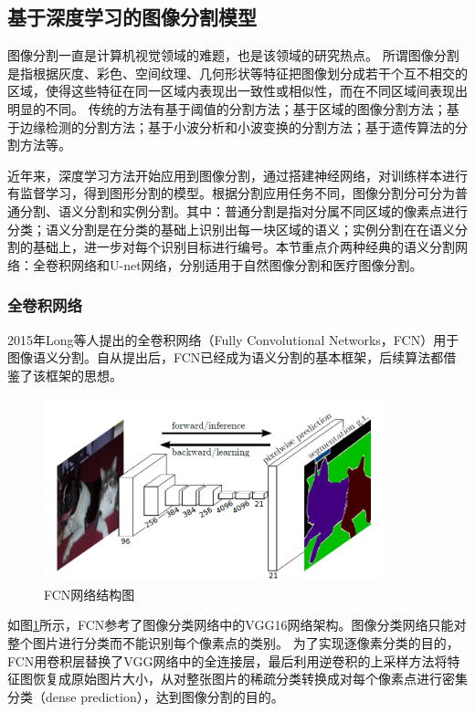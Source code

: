 \subsection{基于深度学习的图像分割模型}
图像分割一直是计算机视觉领域的难题，也是该领域的研究热点。
所谓图像分割是指根据灰度、彩色、空间纹理、几何形状等特征把图像划分成若干个互不相交的区域，使得这些特征在同一区域内表现出一致性或相似性，而在不同区域间表现出明显的不同。
传统的方法有基于阈值的分割方法；基于区域的图像分割方法；基于边缘检测的分割方法；基于小波分析和小波变换的分割方法；基于遗传算法的分割方法等\cite{图像分割方法综述}。

近年来，深度学习方法开始应用到图像分割，通过搭建神经网络，对训练样本进行有监督学习，得到图形分割的模型。根据分割应用任务不同，图像分割分可分为普通分割、语义分割和实例分割。其中：普通分割是指对分属不同区域的像素点进行分类；语义分割是在分类的基础上识别出每一块区域的语义；实例分割在在语义分割的基础上，进一步对每个识别目标进行编号。本节重点介两种经典的语义分割网络：全卷积网络和U-net网络，分别适用于自然图像分割和医疗图像分割。


\subsubsection{全卷积网络}
2015年Long等人提出的全卷积网络（Fully Convolutional Networks，FCN）用于图像语义分割\cite{Long2015Fully}。自从提出后，FCN已经成为语义分割的基本框架，后续算法都借鉴了该框架的思想。

\begin{figure}[htp]
	\centering
	\includegraphics[width=0.88\textwidth]{figures/FCN.png}
	\caption{FCN网络结构图}
	\label{fig:FCN}
\end{figure}

如图\ref{fig:FCN}所示，FCN参考了图像分类网络中的VGG16\cite{2014Very}网络架构。图像分类网络只能对整个图片进行分类而不能识别每个像素点的类别。
为了实现逐像素分类的目的，FCN用卷积层替换了VGG网络中的全连接层，最后利用逆卷积的上采样方法将特征图恢复成原始图片大小，从对整张图片的稀疏分类转换成对每个像素点进行密集分类（dense prediction），达到图像分割的目的。

